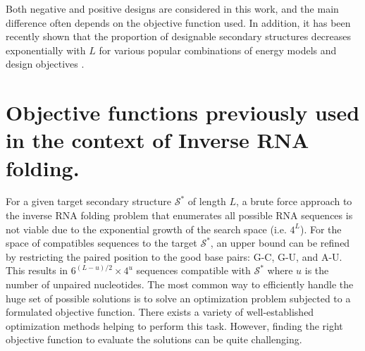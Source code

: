 Both negative and positive designs are considered in this work, and the main difference often depends on the objective function used. In addition, it has been recently shown that the proportion of designable secondary structures decreases exponentially with $L$ for various popular combinations of energy models and design objectives \cite{yao2019exponentially}.


\section{Objective functions previously used in the context of Inverse RNA folding.}

For a given target secondary structure $\mathcal{S}^*$ of length $L$, a brute force approach to the inverse RNA folding problem that enumerates all possible RNA sequences is not viable due to the exponential growth of the search space (i.e. $4^L$). For the space of compatibles sequences to the target $\mathcal{S}^*$, an upper bound can be refined by restricting the paired position to the good base pairs: G-C, G-U, and A-U. This results in $6^{(L-u)/2} \times 4^u$ sequences compatible with $\mathcal{S}^*$ where $u$ is the number of unpaired nucleotides. The most common way to efficiently handle the huge set of possible solutions is to solve an optimization problem subjected to a formulated objective function. There exists a variety of well-established optimization methods helping to perform this task. However, finding the right objective function to evaluate the solutions can be quite challenging. 

